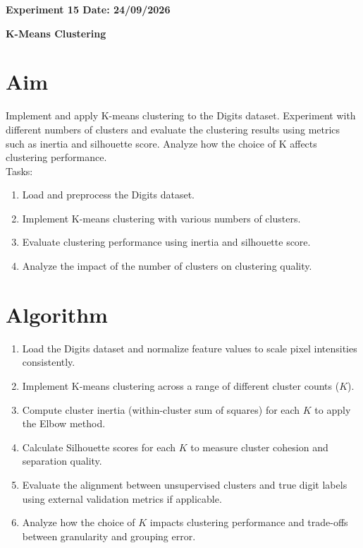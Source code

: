\documentclass[12pt, a4paper]{report}
\begin{document}
\newpage 
\begin{center}
	\bfseries 
	Experiment 15 \hfill Date:  24/09/2026
\end{center}

\label{exp:15}
\begin{center}
	{\bfseries \Huge K-Means Clustering}	
\end{center}

\section*{Aim} 
Implement and apply K-means clustering to the Digits dataset. Experiment with different numbers of clusters and
evaluate the clustering results using metrics such as inertia and silhouette score. Analyze how the choice of K
affects clustering performance.\\
Tasks:
\begin{enumerate}[\quad -]
	\itemsep 0em 
	
	\item Load and preprocess the Digits dataset.
	\item Implement K-means clustering with various numbers of clusters.
	\item Evaluate clustering performance using inertia and silhouette score.
	\item Analyze the impact of the number of clusters on clustering quality.
\end{enumerate}


\section*{Algorithm} 
\begin{enumerate}
	\item Load the Digits dataset and normalize feature values to scale pixel intensities consistently.
	\item Implement K-means clustering across a range of different cluster counts ($K$).
	\item Compute cluster inertia (within-cluster sum of squares) for each $K$ to apply the Elbow method.
	\item Calculate Silhouette scores for each $K$ to measure cluster cohesion and separation quality.
	\item Evaluate the alignment between unsupervised clusters and true digit labels using external validation metrics if applicable.
	\item Analyze how the choice of $K$ impacts clustering performance and trade-offs between granularity and grouping error.
\end{enumerate}
\end{document}
